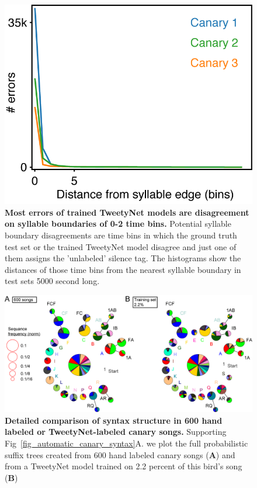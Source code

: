 \documentclass[10pt,letterpaper]{article}
\begin{document}
\begin{figure}[!ht]
\includegraphics[scale=1.0]{Figures/Supplementaries/EdgeErrorDistCanaries.png}
\caption{{\bf Most errors of trained TweetyNet models are disagreement on syllable boundaries of 0-2 time bins.} Potential syllable boundary disagreements are time bins in which the ground truth test set or the trained TweetyNet model disagree and just one of them assigns the 'unlabeled' silence tag. The histograms show the distances of those time bins from the nearest syllable boundary in test sets 5000 second long.}
\label{suppfig_errors_in_boundaries}
\end{figure}

\begin{figure}[!ht]
\includegraphics[scale=0.85]{figures/Supplementaries/suppfig_tweety_vs_600_hand_labeled_songs.png}
\caption{{\bf Detailed comparison of syntax structure in 600 hand labeled or TweetyNet-labeled canary songs.} Supporting Fig~\ref{fig_automatic_canary_syntax}A. we plot the full probabilistic suffix trees created from 600 hand labeled canary songs ({\bf A}) and from a TweetyNet model trained on 2.2 percent of this bird's song ({\bf B})}
\label{suppfig_tweetynet_vs_600_hand_labeled_songs}
\end{figure}
\end{document}
